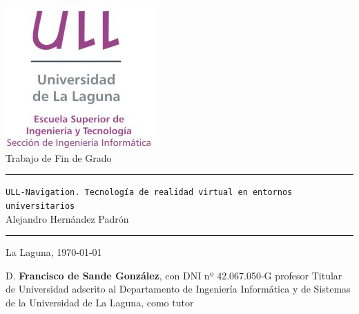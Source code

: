 \documentclass[spanish,a4paper,12pt,oneside]{extreport}
\newcommand{\BulletP}{\texttt{ULL-Navigation.{ Tecnología de realidad virtual en entornos universitarios}}}
\begin{document}
\renewcommand{\lstlistingname}{Listado}%

\pagestyle{empty}
\thispagestyle{empty}


\newcommand{\HRule}{\rule{\linewidth}{1mm}}
\setlength{\parindent}{0mm}
\setlength{\parskip}{0mm}


\begin{center}
\includegraphics[scale=0.8]{images/logo_vertical}\\[10mm]
{\Huge Trabajo de Fin de Grado}
\end{center}

\HRule
\begin{flushright}
        {\Huge \BulletP{}} \\[2.5mm]
        {\Large Alejandro Hernández Padrón} \\[5mm]


\end{flushright}
\HRule
{}
\begin{center}
  \Large La Laguna, \today
\end{center}

\setlength{\parindent}{5mm}

\newpage
\thispagestyle{empty}

D. {\bf Francisco de Sande González}, con DNI nº 42.067.050-G
profesor
Titular de Universidad
adscrito al Departamento
de Ingeniería Informática y de Sistemas
de la Universidad de La Laguna, como tutor
\end{document}

